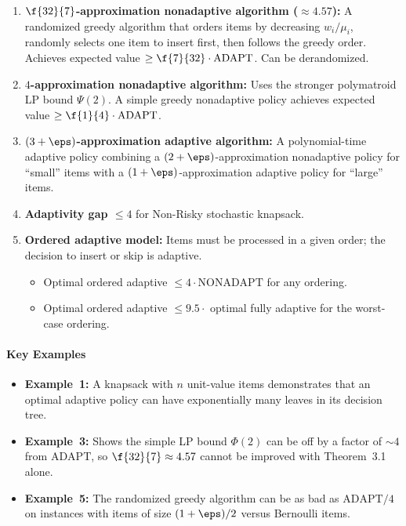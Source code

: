 \begin{enumerate}
    \item \textbf{$\f{32}{7}$-approximation nonadaptive algorithm ($\approx 4.57$):}
    A randomized greedy algorithm that orders items by decreasing $w_i/\mu_i$, randomly selects one item to insert first, then follows the greedy order. Achieves expected value $\ge \f{7}{32} \cdot \mathrm{ADAPT}$. Can be derandomized.

    \item \textbf{$4$-approximation nonadaptive algorithm:}
    Uses the stronger polymatroid LP bound $\Psi(2)$. A simple greedy nonadaptive policy achieves expected value $\ge \f{1}{4} \cdot \mathrm{ADAPT}$.

    \item \textbf{$(3+\eps)$-approximation adaptive algorithm:}
    A polynomial-time adaptive policy combining a $(2+\eps)$-approximation nonadaptive policy for ``small'' items with a $(1+\eps)$-approximation adaptive policy for ``large'' items.

    \item \textbf{Adaptivity gap $\le 4$} for Non-Risky stochastic knapsack.

    \item \textbf{Ordered adaptive model:} Items must be processed in a given order; the decision to insert or skip is adaptive.
    \begin{itemize}
        \item Optimal ordered adaptive $\le 4 \cdot \mathrm{NONADAPT}$ for any ordering.
        \item Optimal ordered adaptive $\le 9.5 \cdot$ optimal fully adaptive for the worst-case ordering.
    \end{itemize}
\end{enumerate}

\paragraph{Key Examples}

\begin{itemize}
    \item \textbf{Example~1:} A knapsack with $n$ unit-value items demonstrates that an optimal adaptive policy can have exponentially many leaves in its decision tree.
    \item \textbf{Example~3:} Shows the simple LP bound $\Phi(2)$ can be off by a factor of $\sim 4$ from $\mathrm{ADAPT}$, so $\f{32}{7} \approx 4.57$ cannot be improved with Theorem~3.1 alone.
    \item \textbf{Example~5:} The randomized greedy algorithm can be as bad as $\mathrm{ADAPT}/4$ on instances with items of size $(1+\eps)/2$ versus Bernoulli items.
\end{itemize}

